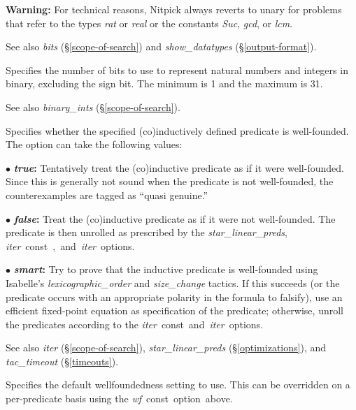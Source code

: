 \documentclass[a4paper,12pt]{article}
\begin{document}
\begin{enum}
\textbf{Warning:} For technical reasons, Nitpick always reverts to unary for
problems that refer to the types \textit{rat} or \textit{real} or the constants
\textit{Suc}, \textit{gcd}, or \textit{lcm}.

{\small See also \textit{bits} (\S\ref{scope-of-search}) and
\textit{show\_datatypes} (\S\ref{output-format}).}

Specifies the number of bits to use to represent natural numbers and integers in
binary, excluding the sign bit. The minimum is 1 and the maximum is 31.

{\small See also \textit{binary\_ints} (\S\ref{scope-of-search}).}

Specifies whether the specified (co)in\-duc\-tively defined predicate is
well-founded. The option can take the following values:

\begin{enum}
\item[$\bullet$] \textbf{\textit{true}:} Tentatively treat the (co)in\-duc\-tive
predicate as if it were well-founded. Since this is generally not sound when the
predicate is not well-founded, the counterexamples are tagged as ``quasi
genuine.''

\item[$\bullet$] \textbf{\textit{false}:} Treat the (co)in\-duc\-tive predicate
as if it were not well-founded. The predicate is then unrolled as prescribed by
the \textit{star\_linear\_preds}, \textit{iter}~\qty{const}, and \textit{iter}
options.

\item[$\bullet$] \textbf{\textit{smart}:} Try to prove that the inductive
predicate is well-founded using Isabelle's \textit{lexicographic\_order} and
\textit{size\_change} tactics. If this succeeds (or the predicate occurs with an
appropriate polarity in the formula to falsify), use an efficient fixed-point
equation as specification of the predicate; otherwise, unroll the predicates
according to the \textit{iter}~\qty{const} and \textit{iter} options.
\end{enum}

\nopagebreak
{\small See also \textit{iter} (\S\ref{scope-of-search}),
\textit{star\_linear\_preds} (\S\ref{optimizations}), and \textit{tac\_timeout}
(\S\ref{timeouts}).}

Specifies the default wellfoundedness setting to use. This can be overridden on
a per-predicate basis using the \textit{wf}~\qty{const} option above.


\end{enum}
\end{document}
